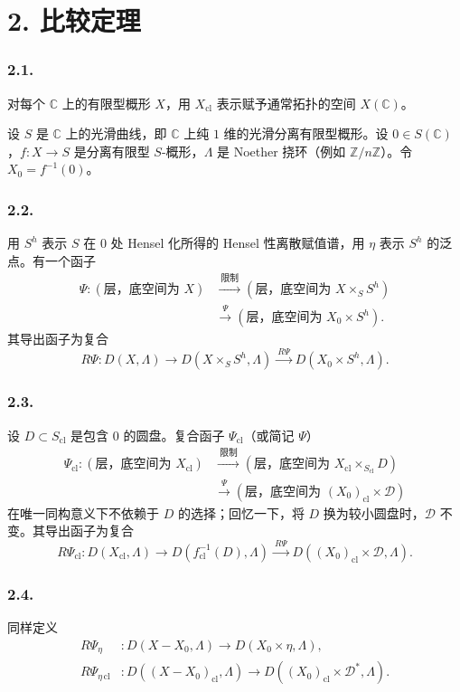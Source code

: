 \section*{2. 比较定理}

\subsubsection*{2.1.}
对每个 $\mathbb C$ 上的有限型概形 $X$，用 $X_{\mathrm{cl}}$ 表示赋予通常拓扑的空间 $X(\mathbb C)$。

设 $S$ 是 $\mathbb C$ 上的光滑曲线，即 $\mathbb C$ 上纯 $1$ 维的光滑分离有限型概形。设 $0\in S(\mathbb C)$，$f:X\longrightarrow S$ 是分离有限型 $S$-概形，$\Lambda$ 是 Noether 挠环（例如 $\mathbb Z/n\mathbb Z$）。令 $X_0=f^{-1}(0)$。

\subsubsection*{2.2.}
用 $S^h$ 表示 $S$ 在 $0$ 处 Hensel 化所得的 Hensel 性离散赋值谱，用 $\eta$ 表示 $S^h$ 的泛点。有一个函子
\[
\begin{aligned}
\Psi:(\text{层，底空间为 }X)
&\xrightarrow{\ \text{限制}\ }
(\text{层，底空间为 }X\times_SS^h)\\
&\xrightarrow{\ \Psi\ }
(\text{层，底空间为 }X_0\times S^h).
\end{aligned}
\]
其导出函子为复合
\[
R\Psi:D(X,\Lambda)
\longrightarrow D(X\times_SS^h,\Lambda)
\xrightarrow{\ R\Psi\ }D(X_0\times S^h,\Lambda).
\]

\subsubsection*{2.3.}
设 $D\subset S_{\mathrm{cl}}$ 是包含 $0$ 的圆盘。复合函子 $\Psi_{\mathrm{cl}}$（或简记 $\Psi$）
\[
\begin{aligned}
\Psi_{\mathrm{cl}}:(\text{层，底空间为 }X_{\mathrm{cl}})
&\xrightarrow{\ \text{限制}\ }
(\text{层，底空间为 }X_{\mathrm{cl}}\times_{S_{\mathrm{cl}}}D)\\
&\xrightarrow{\ \Psi\ }
(\text{层，底空间为 }(X_0)_{\mathrm{cl}}\times\mathcal D)
\end{aligned}
\]
在唯一同构意义下不依赖于 $D$ 的选择；回忆一下，将 $D$ 换为较小圆盘时，$\mathcal D$ 不变。其导出函子为复合
\[
R\Psi_{\mathrm{cl}}:D(X_{\mathrm{cl}},\Lambda)
\longrightarrow D(f_{\mathrm{cl}}^{-1}(D),\Lambda)
\xrightarrow{\ R\Psi\ }
D((X_0)_{\mathrm{cl}}\times\mathcal D,\Lambda).
\]

\subsubsection*{2.4.}
同样定义
\[
\begin{aligned}
R\Psi_\eta &:D(X-X_0,\Lambda)
  \longrightarrow D(X_0\times\eta,\Lambda),\\
R\Psi_{\eta\,\mathrm{cl}} &:D((X-X_0)_{\mathrm{cl}},\Lambda)
  \longrightarrow D((X_0)_{\mathrm{cl}}\times\mathcal D^*,\Lambda).
\end{aligned}
\]


